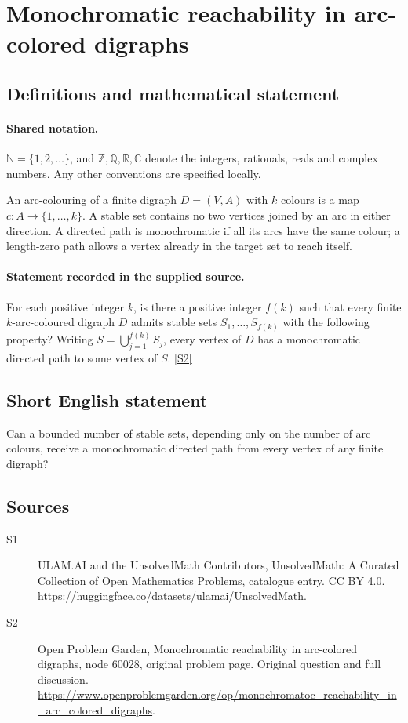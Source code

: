 \documentclass[11pt]{article}
\newcommand{\sref}[2]{\hyperlink{source:#1:#2}{[S#2]}}
\begin{document}
\section{Monochromatic reachability in arc-colored digraphs}\label{statement}

\subsection{Definitions and mathematical statement}

\paragraph{Shared notation.}$\mathbb N=\{1,2,\ldots\}$, and $\mathbb Z,\mathbb Q,\mathbb R,\mathbb C$ denote the integers, rationals, reals and complex numbers. Any other conventions are specified locally.


An arc-colouring of a finite digraph $D=(V,A)$ with $k$ colours is a map $c:A\to\{1,\ldots,k\}$. A stable set contains no two vertices joined by an arc in either direction. A directed path is monochromatic if all its arcs have the same colour; a length-zero path allows a vertex already in the target set to reach itself.
\paragraph{Statement recorded in the supplied source.}
For each positive integer $k$, is there a positive integer $f(k)$ such that every finite $k$-arc-coloured digraph $D$ admits stable sets $S_1,\ldots,S_{f(k)}$ with the following property? Writing $S=\bigcup_{j=1}^{f(k)}S_j$, every vertex of $D$ has a monochromatic directed path to some vertex of $S$. \sref{statement}{2}
\subsection{Short English statement}
Can a bounded number of stable sets, depending only on the number of arc colours, receive a monochromatic directed path from every vertex of any finite digraph?
\subsection{Sources}
\begin{description}
\item[\hypertarget{source:statement:1}{S1}] ULAM.AI and the UnsolvedMath Contributors, UnsolvedMath: A Curated Collection of Open Mathematics Problems, catalogue entry. CC BY 4.0. \url{https://huggingface.co/datasets/ulamai/UnsolvedMath}.
\item[\hypertarget{source:statement:2}{S2}] Open Problem Garden, Monochromatic reachability in arc-colored digraphs, node 60028, original problem page. Original question and full discussion. \url{https://www.openproblemgarden.org/op/monochromatoc_reachability_in_arc_colored_digraphs}.

\end{description}
\label{end:statement}
\end{document}

